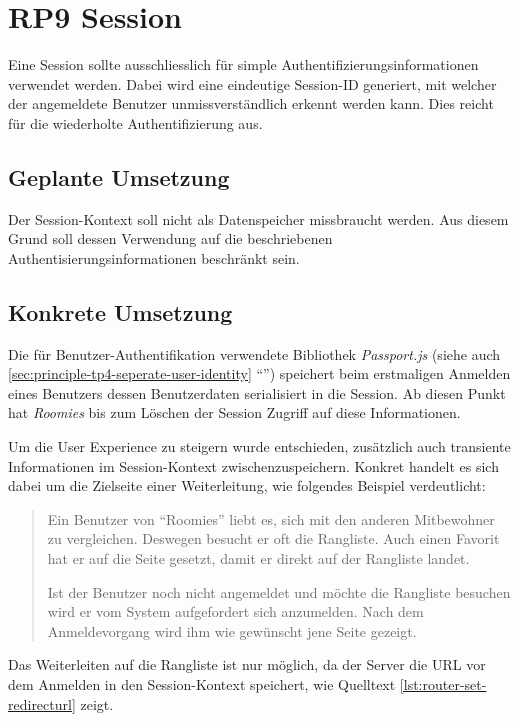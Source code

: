 \section{RP9 Session}
\label{sec:principle-rp9-session}

Eine Session sollte ausschliesslich für simple Authentifizierungsinformationen verwendet werden. Dabei wird eine eindeutige Session-ID generiert, mit welcher der angemeldete Benutzer unmissverständlich erkennt werden kann. Dies reicht für die wiederholte Authentifizierung aus.

\subsection*{Geplante Umsetzung}
Der Session-Kontext soll nicht als Datenspeicher missbraucht werden. Aus diesem Grund soll dessen Verwendung auf die beschriebenen Authentisierungsinformationen beschränkt sein.

\subsection*{Konkrete Umsetzung}
Die für Benutzer-Authentifikation verwendete Bibliothek \emph{Passport.js} \cite{Passportjs} (siehe auch \ref{sec:principle-tp4-seperate-user-identity} ``'') speichert beim erstmaligen Anmelden eines Benutzers dessen Benutzerdaten serialisiert in die Session. Ab diesen Punkt hat \emph{Roomies} bis zum Löschen der Session Zugriff auf diese Informationen.

Um die User Experience zu steigern wurde entschieden, zusätzlich auch transiente Informationen im Session-Kontext zwischenzuspeichern. Konkret handelt es sich dabei um die Zielseite einer Weiterleitung, wie folgendes Beispiel verdeutlicht:

\begin{quotation}
Ein Benutzer von ``Roomies'' liebt es, sich mit den anderen Mitbewohner zu vergleichen. Deswegen besucht er oft die Rangliste. Auch einen Favorit hat er auf die Seite gesetzt, damit er direkt auf der Rangliste landet.

Ist der Benutzer noch nicht angemeldet und möchte die Rangliste besuchen wird er vom System aufgefordert sich anzumelden. Nach dem Anmeldevorgang wird ihm wie gewünscht jene Seite gezeigt.
\end{quotation}

Das Weiterleiten auf die Rangliste ist nur möglich, da der Server die \gls{URL} vor dem Anmelden in den Session-Kontext speichert, wie Quelltext \ref{lst:router-set-redirecturl} zeigt.

